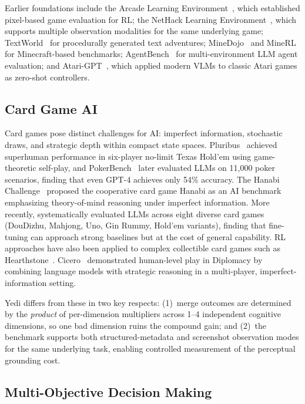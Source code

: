 \documentclass[11pt]{article}
\begin{document}
Earlier foundations include the Arcade Learning Environment~\citep{bellemare2013ale},
which established pixel-based game evaluation for RL; the NetHack Learning
Environment~\citep{kuttler2020nethack}, which supports multiple observation
modalities for the same underlying game; TextWorld~\citep{cote2018textworld}
for procedurally generated text adventures;
MineDojo~\citep{fan2022minedojo} and MineRL~\citep{guss2019minerl} for
Minecraft-based benchmarks; AgentBench~\citep{liu2024agentbench} for
multi-environment LLM agent evaluation; and
Atari-GPT~\citep{waytowich2024atarigpt}, which applied modern VLMs to classic
Atari games as zero-shot controllers.

\subsection{Card Game AI}

Card games pose distinct challenges for AI: imperfect information, stochastic
draws, and strategic depth within compact state spaces.
Pluribus~\citep{brown2019pluribus} achieved superhuman performance in six-player
no-limit Texas Hold'em using game-theoretic self-play, and
PokerBench~\citep{zhuang2025pokerbench} later evaluated LLMs on 11,000 poker
scenarios, finding that even GPT-4 achieves only 54\% accuracy.
The Hanabi Challenge~\citep{bard2020hanabi} proposed the cooperative card game
Hanabi as an AI benchmark emphasizing theory-of-mind reasoning under imperfect
information. More recently, \citet{wang2025llmcardgames} systematically
evaluated LLMs across eight diverse card games (DouDizhu, Mahjong, Uno, Gin
Rummy, Hold'em variants), finding that fine-tuning can approach strong baselines
but at the cost of general capability. RL approaches have also been applied to
complex collectible card games such as Hearthstone~\citep{hearthstone2023}.
Cicero~\citep{meta2022cicero} demonstrated human-level play in Diplomacy by
combining language models with strategic reasoning in a multi-player,
imperfect-information setting.

Yedi differs from these in two key respects: (1)~merge outcomes are determined
by the \emph{product} of per-dimension multipliers across 1--4 independent
cognitive dimensions, so one bad dimension ruins the compound gain; and (2)~the
benchmark supports both structured-metadata and screenshot observation modes for
the same underlying task, enabling controlled measurement of the perceptual
grounding cost.

\subsection{Multi-Objective Decision Making}
\end{document}
